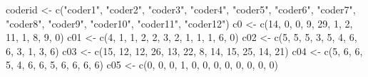 \documentclass[
]{article}
\newenvironment{Shaded}{\begin{snugshade}}{\end{snugshade}}
\newcommand{\DecValTok}[1]{\textcolor[rgb]{0.00,0.00,0.81}{#1}}
\newcommand{\FunctionTok}[1]{\textcolor[rgb]{0.00,0.00,0.00}{#1}}
\newcommand{\NormalTok}[1]{#1}
\newcommand{\OtherTok}[1]{\textcolor[rgb]{0.56,0.35,0.01}{#1}}
\newcommand{\StringTok}[1]{\textcolor[rgb]{0.31,0.60,0.02}{#1}}
\begin{document}
\begin{Shaded}
\begin{Highlighting}[]
\NormalTok{coderid }\OtherTok{\textless{}{-}} \FunctionTok{c}\NormalTok{(}\StringTok{"coder1"}\NormalTok{, }\StringTok{"coder2"}\NormalTok{, }\StringTok{"coder3"}\NormalTok{, }\StringTok{"coder4"}\NormalTok{, }\StringTok{"coder5"}\NormalTok{,}
    \StringTok{"coder6"}\NormalTok{, }\StringTok{"coder7"}\NormalTok{, }\StringTok{"coder8"}\NormalTok{, }\StringTok{"coder9"}\NormalTok{, }\StringTok{"coder10"}\NormalTok{, }\StringTok{"coder11"}\NormalTok{,}
    \StringTok{"coder12"}\NormalTok{)}
\NormalTok{c0 }\OtherTok{\textless{}{-}} \FunctionTok{c}\NormalTok{(}\DecValTok{14}\NormalTok{, }\DecValTok{0}\NormalTok{, }\DecValTok{0}\NormalTok{, }\DecValTok{9}\NormalTok{, }\DecValTok{29}\NormalTok{, }\DecValTok{1}\NormalTok{, }\DecValTok{2}\NormalTok{, }\DecValTok{11}\NormalTok{, }\DecValTok{1}\NormalTok{, }\DecValTok{8}\NormalTok{, }\DecValTok{9}\NormalTok{, }\DecValTok{0}\NormalTok{)}
\NormalTok{c01 }\OtherTok{\textless{}{-}} \FunctionTok{c}\NormalTok{(}\DecValTok{4}\NormalTok{, }\DecValTok{1}\NormalTok{, }\DecValTok{1}\NormalTok{, }\DecValTok{2}\NormalTok{, }\DecValTok{2}\NormalTok{, }\DecValTok{3}\NormalTok{, }\DecValTok{2}\NormalTok{, }\DecValTok{1}\NormalTok{, }\DecValTok{1}\NormalTok{, }\DecValTok{1}\NormalTok{, }\DecValTok{6}\NormalTok{, }\DecValTok{0}\NormalTok{)}
\NormalTok{c02 }\OtherTok{\textless{}{-}} \FunctionTok{c}\NormalTok{(}\DecValTok{5}\NormalTok{, }\DecValTok{5}\NormalTok{, }\DecValTok{5}\NormalTok{, }\DecValTok{3}\NormalTok{, }\DecValTok{5}\NormalTok{, }\DecValTok{4}\NormalTok{, }\DecValTok{6}\NormalTok{, }\DecValTok{6}\NormalTok{, }\DecValTok{3}\NormalTok{, }\DecValTok{1}\NormalTok{, }\DecValTok{3}\NormalTok{, }\DecValTok{6}\NormalTok{)}
\NormalTok{c03 }\OtherTok{\textless{}{-}} \FunctionTok{c}\NormalTok{(}\DecValTok{15}\NormalTok{, }\DecValTok{12}\NormalTok{, }\DecValTok{12}\NormalTok{, }\DecValTok{26}\NormalTok{, }\DecValTok{13}\NormalTok{, }\DecValTok{22}\NormalTok{, }\DecValTok{8}\NormalTok{, }\DecValTok{14}\NormalTok{, }\DecValTok{15}\NormalTok{, }\DecValTok{25}\NormalTok{, }\DecValTok{14}\NormalTok{, }\DecValTok{21}\NormalTok{)}
\NormalTok{c04 }\OtherTok{\textless{}{-}} \FunctionTok{c}\NormalTok{(}\DecValTok{5}\NormalTok{, }\DecValTok{6}\NormalTok{, }\DecValTok{6}\NormalTok{, }\DecValTok{5}\NormalTok{, }\DecValTok{4}\NormalTok{, }\DecValTok{6}\NormalTok{, }\DecValTok{6}\NormalTok{, }\DecValTok{5}\NormalTok{, }\DecValTok{6}\NormalTok{, }\DecValTok{6}\NormalTok{, }\DecValTok{6}\NormalTok{, }\DecValTok{6}\NormalTok{)}
\NormalTok{c05 }\OtherTok{\textless{}{-}} \FunctionTok{c}\NormalTok{(}\DecValTok{0}\NormalTok{, }\DecValTok{0}\NormalTok{, }\DecValTok{0}\NormalTok{, }\DecValTok{1}\NormalTok{, }\DecValTok{0}\NormalTok{, }\DecValTok{0}\NormalTok{, }\DecValTok{0}\NormalTok{, }\DecValTok{0}\NormalTok{, }\DecValTok{0}\NormalTok{, }\DecValTok{0}\NormalTok{, }\DecValTok{0}\NormalTok{, }\DecValTok{0}\NormalTok{)}

\end{Highlighting}
\end{Shaded}
\end{document}
